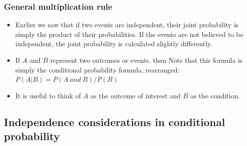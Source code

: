 \documentclass[11pt,containsverbatim,handout]{beamer}
\begin{document}

\begin{frame}
\frametitle{General multiplication rule}

\begin{itemize}

\item Earlier we saw that if two events are independent, their joint probability is simply the product of their probabilities. If the events are not believed to be independent, the joint probability is calculated slightly differently.

\pause

\item If $A$ and $B$ represent two outcomes or events, then
\formula{\[ P(A~and~B) = P(A|B) \times P(B) \]}
Note that this formula is simply the conditional probability formula, rearranged: $P(A|B)= P(A~and~B) / P(B)$
\pause

\item It is useful to think of $A$ as the outcome of interest and $B$ as the condition.

\end{itemize}

\end{frame}


\subsection{Independence considerations in conditional probability}

\end{document}
